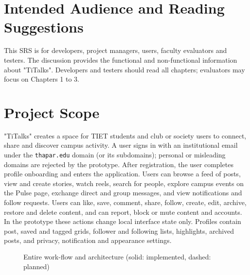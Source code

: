\documentclass{scrreprt}
\begin{document}
\section{Intended Audience and Reading Suggestions}
This SRS is for developers, project managers, users, faculty evaluators and testers. The discussion provides the functional and non-functional information about "TiTalks". Developers and testers should read all chapters; evaluators may focus on Chapters 1 to 3.

\section{Project Scope}
"TiTalks" creates a space for TIET students and club or society users to connect, share and discover campus activity.
\newline
A user signs in with an institutional email under the \texttt{thapar.edu} domain (or its subdomains); personal or misleading domains are rejected by the prototype. After registration, the user completes profile onboarding and enters the application.
\newline
Users can browse a feed of posts, view and create stories, watch reels, search for people, explore campus events on the Pulse page, exchange direct and group messages, and view notifications and follow requests.
\newline
Users can like, save, comment, share, follow, create, edit, archive, restore and delete content, and can report, block or mute content and accounts. In the prototype these actions change local interface state only.
\newline
Profiles contain post, saved and tagged grids, follower and following lists, highlights, archived posts, and privacy, notification and appearance settings.
\newline
\begin{figure}[h!]
\centering
{}
\caption{Entire work-flow and architecture (solid: implemented, dashed: planned)}
\label{fig:workflow}
\end{figure}
\end{document}

